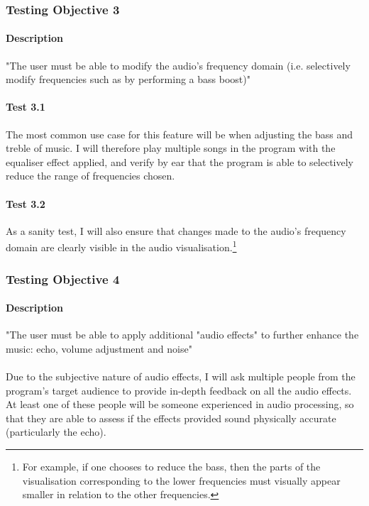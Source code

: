 \pagebreak
\subsubsection{Testing Objective 3}
\paragraph{Description} "The user must be able to modify the audio's frequency domain (i.e. selectively modify frequencies such as by performing a bass boost)"

\paragraph{Test 3.1}
The most common use case for this feature will be when adjusting the bass and treble of music. I will therefore play multiple songs in the program with the equaliser effect applied, and verify by ear that the program is able to selectively reduce the range of frequencies chosen.

\paragraph{Test 3.2}
As a sanity test, I will also ensure that changes made to the audio's frequency domain are clearly visible in the audio visualisation.\footnote{
	For example, if one chooses to reduce the bass, then the parts
	of the visualisation corresponding to the lower frequencies must
	visually appear smaller in relation to the other frequencies.
}

\pagebreak
\subsubsection{Testing Objective 4}
\paragraph{Description} "The user must be able to apply additional "audio effects" to further enhance the music: echo, volume adjustment and noise"

\paragraph{}
Due to the subjective nature of audio effects, I will ask multiple people from the program's target audience to provide in-depth feedback on all the audio effects.
At least one of these people will be someone experienced in audio processing, so that they are able to assess if the effects provided sound physically accurate
(particularly the echo).

